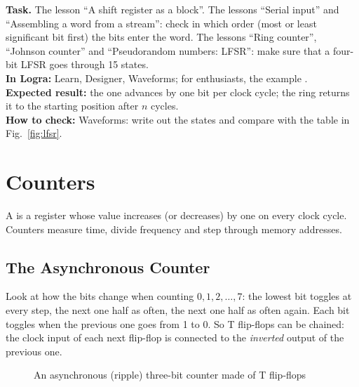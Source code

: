 \begin{diybox}
\textbf{Task.}  The lesson ``A shift register as a block''.  The lessons
``Serial input'' and ``Assembling a word from a stream'': check in which order
(most or least significant bit first) the bits enter the word.  The lessons
``Ring counter'', ``Johnson counter'' and ``Pseudorandom numbers: LFSR'': make sure that
a four-bit LFSR goes through 15 states.\\
\textbf{In Logra:} Learn, Designer, Waveforms; for enthusiasts, the
example .\\
\textbf{Expected result:} the one advances by one bit per clock cycle;
the ring returns it to the starting position after $n$ cycles.\\
\textbf{How to check:} Waveforms: write out the states and compare with the table
in Fig.~\ref{fig:lfsr}.
\end{diybox}

\section{Counters}

A  is a register whose value increases (or decreases) by one on
every clock cycle. Counters measure time, divide
frequency and step through memory addresses.

\subsection{The Asynchronous Counter}

Look at how the bits change when counting $0, 1, 2, \ldots, 7$: the lowest bit
toggles at every step, the next one half as often, the next one half as often
again. Each bit toggles when the previous one goes from 1
to 0. So T flip-flops can be chained: the clock input of each
next flip-flop is connected to the \emph{inverted} output of the previous one.

\begin{figure}[H]
\centering
{}
\caption{An asynchronous (ripple) three-bit counter made of T flip-flops}
\label{fig:ripple}
\end{figure}


